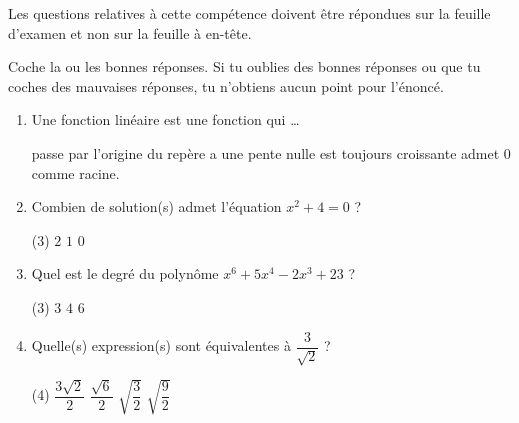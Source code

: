 \documentclass[../partie1.tex]{subfiles}
\begin{document}
\begin{consigne}
    Les questions relatives à cette compétence doivent être répondues sur la feuille d'examen et non sur la feuille à en-tête.
\end{consigne}
\begin{exercise}[points=4]
    Coche la ou les bonnes réponses. Si tu oublies des bonnes réponses ou que tu coches des mauvaises réponses, tu n'obtiens aucun point pour l'énoncé.
    \begin{enumerate}
        \item Une fonction linéaire est une fonction qui \dots
              \begin{QCM}
                  \choice passe par l'origine du repère
                  \choice a une pente nulle
                  \choice est toujours croissante
                  \choice admet $0$ comme racine.
              \end{QCM}
        \item Combien de solution(s) admet l'équation $x^2+4=0$ ?
              \begin{QCM}(3)
                  \choice $2$
                  \choice $1$
                  \choice $0$
              \end{QCM}
        \item Quel est le degré du polynôme $x^6 + 5x^4 -2x^3 +23$ ?
              \begin{QCM}(3)
                  \choice $3$
                  \choice $4$
                  \choice $6$
              \end{QCM}
        \item Quelle(s) expression(s) sont équivalentes à $\dfrac{3}{\sqrt{2}}$ ?
              \begin{QCM}(4)
                  \choice $\dfrac{3\sqrt{2}}{2}$
                  \choice $\dfrac{\sqrt{6}}{2}$
                  \choice $\sqrt{\dfrac{3}{2}}$
                  \choice $\sqrt{\dfrac{9}{2}}$
              \end{QCM}
    \end{enumerate}
\end{exercise}
\end{document}
